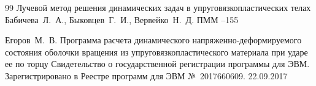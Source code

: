\begin{thebibliography}{99}
\paper Лучевой метод решения динамических задач в упруговязкопластических телах
\by    Бабичева~Л.~А., Быковцев~Г.~И., Вервейко~Н.~Д.
\jour ПММ
--155












\by Егоров~М.~В.
\preprint Программа расчета динамического напряженно-деформируемого состояния оболочки вращения из упруговязкопластического материала при ударе ее по торцу 
\preprintinfo Свидетельство о государственной регистрации программы для ЭВМ. Зарегистрировано в Реестре программ для ЭВМ №~2017660609. 22.09.2017

\end{thebibliography}


\newpage

\makeentitle

\vspace{-5mm}



